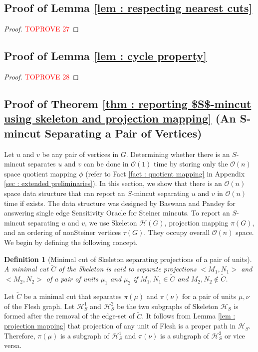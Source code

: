 \documentclass[letterpaper,11pt]{article}
\newtheorem{definition}{Definition}[]
\begin{document}
\subsection{Proof of Lemma \ref{lem : respecting nearest cuts}} \label{app : respecting nearest cuts}
\begin{proof}\textcolor{red}{TOPROVE 27}\end{proof}

\subsection{Proof of Lemma \ref{lem : cycle property}} \label{app : proof of cycle property}
\begin{proof}\textcolor{red}{TOPROVE 28}\end{proof}


\subsection{Proof of Theorem \ref{thm : reporting $S$-mincut using skeleton and projection mapping} (An S-mincut Separating a Pair of Vertices)} \label{app : proof of theorem 58 for reporting S mincut separating vertices}
Let $u$ and $v$ be any pair of vertices in $G$. Determining whether there is an $S$-mincut separates $u$ and $v$ can be done in ${\mathcal O}(1)$ time by storing only the ${\mathcal O}(n)$ space quotient mapping $\phi$ (refer to Fact \ref{fact : quotient mapping} in Appendix \ref{sec : extended preliminaries}). In this section, we show that there is an ${\mathcal O}(n)$ space data structure that can report an $S$-mincut separating $u$ and $v$ in ${\mathcal O}(n)$ time if exists.
The data structure was designed by Baswana and Pandey \cite{DBLP:conf/soda/BaswanaP22} for answering single edge Sensitivity Oracle for Steiner mincuts. To report an $S$-mincut separating $u$ and $v$, we use Skeleton ${\mathcal H}(G)$, projection mapping $\pi(G)$, and an ordering of nonSteiner vertices $\tau(G)$. They occupy overall ${\mathcal O}(n)$ space. We begin by defining the following concept.
\begin{definition} [Minimal cut of Skeleton separating projections of a pair of units]
    A minimal cut $\tilde C$ of the Skeleton is said to separate projections $<M_1,N_1>$ and $<M_2,N_2>$ of a pair of units $\mu_1$ and $\mu_2$ if $M_1,N_1\in \tilde C$ and $M_2,N_2\notin \tilde C$.    
\end{definition}
 Let $\tilde C$ be a minimal cut that separates $\pi(\mu)$ and $\pi(\nu)$ for a pair of units $\mu,\nu$ of the Flesh graph. Let ${\mathcal H}_S^1$ and ${\mathcal H}_S^2$ be the two subgraphs of Skeleton ${\mathcal H}_S$ is formed after the removal of the edge-set of $\tilde C$. It follows from Lemma \ref{lem : projection mapping} that projection of any unit of Flesh is a proper path in ${\mathcal H}_S$. Therefore, $\pi(\mu)$ is a subgraph of ${\mathcal H}_S^1$ and $\pi(\nu)$ is a subgraph of ${\mathcal H}_S^2$ or vice versa.
 
\end{document}
